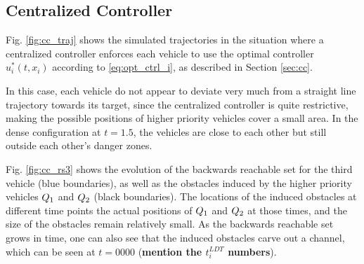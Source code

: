 \subsection{Centralized Controller}
Fig. \ref{fig:cc_traj} shows the simulated trajectories in the situation where a centralized controller enforces each vehicle to use the optimal controller $u^*_i(t, x_i)$ according to \eqref{eq:opt_ctrl_i}, as described in Section \ref{sec:cc}.

In this case, each vehicle do not appear to deviate very much from a straight line trajectory towards its target, since the centralized controller is quite restrictive, making the possible positions of higher priority vehicles cover a small area. In the dense configuration at $t=1.5$, the vehicles are close to each other but still outside each other's danger zones.


Fig. \ref{fig:cc_rs3} shows the evolution of the backwards reachable set for the third vehicle (blue boundaries), as well as the obstacles induced by the higher priority vehicles $Q_1$ and $Q_2$ (black boundaries). The locations of the induced obstacles at different time points the actual positions of $Q_1$ and $Q_2$ at those times, and the size of the obstacles remain relatively small. As the backwards reachable set grows in time, one can also see that the induced obstacles carve out a channel, which can be seen at $t = 0000$ (\textbf{mention the $t_i^{LDT}$ numbers}).


